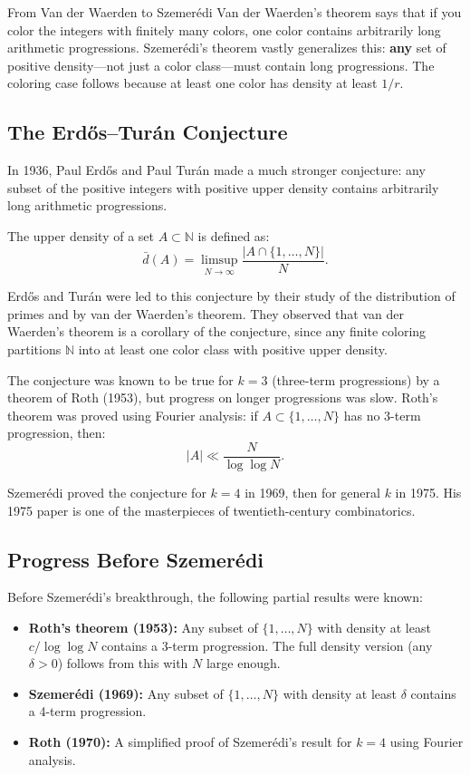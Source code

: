 \begin{knowledgebridge}{From Van der Waerden to Szemer\'edi}
Van der Waerden's theorem says that if you color the integers with finitely many colors, one color contains arbitrarily long arithmetic progressions. Szemer\'edi's theorem vastly generalizes this: \textbf{any} set of positive density---not just a color class---must contain long progressions. The coloring case follows because at least one color has density at least $1/r$.
\end{knowledgebridge}

\subsection{The Erd\H{o}s--Tur\'an Conjecture}

In 1936, Paul Erd\H{o}s and Paul Tur\'an made a much stronger conjecture: any subset of the positive integers with positive upper density contains arbitrarily long arithmetic progressions.

The upper density of a set $A \subset \mathbb{N}$ is defined as:
\[
\bar{d}(A) = \limsup_{N \to \infty} \frac{|A \cap \{1,\ldots,N\}|}{N}.
\]

Erd\H{o}s and Tur\'an were led to this conjecture by their study of the distribution of primes and by van der Waerden's theorem. They observed that van der Waerden's theorem is a corollary of the conjecture, since any finite coloring partitions $\mathbb{N}$ into at least one color class with positive upper density.

The conjecture was known to be true for $k=3$ (three-term progressions) by a theorem of Roth (1953), but progress on longer progressions was slow. Roth's theorem was proved using Fourier analysis: if $A \subset \{1,\ldots,N\}$ has no 3-term progression, then:
\[
|A| \ll \frac{N}{\log\log N}.
\]

Szemer\'edi proved the conjecture for $k=4$ in 1969, then for general $k$ in 1975. His 1975 paper is one of the masterpieces of twentieth-century combinatorics.

\subsection{Progress Before Szemer\'edi}

Before Szemer\'edi's breakthrough, the following partial results were known:
\begin{itemize}
\item \textbf{Roth's theorem (1953):} Any subset of $\{1,\ldots,N\}$ with density at least $c/\log\log N$ contains a 3-term progression. The full density version (any $\delta > 0$) follows from this with $N$ large enough.
\item \textbf{Szemer\'edi (1969):} Any subset of $\{1,\ldots,N\}$ with density at least $\delta$ contains a 4-term progression.
\item \textbf{Roth (1970):} A simplified proof of Szemer\'edi's result for $k=4$ using Fourier analysis.
\end{itemize}

